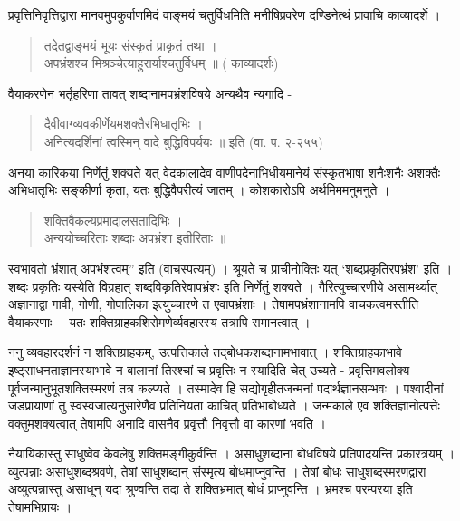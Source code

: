 प्रवृत्तिनिवृत्तिद्वारा मानवमुपकुर्वाणमिदं वाङ्मयं चतुर्विधमिति मनीषिप्रवरेण दण्डिनेत्थं प्रावाचि काव्यादर्शे ।
\begin{verse}
तदेतद्वाङ्मयं भूयः संस्कृतं प्राकृतं तथा ।\\
अपभ्रंशश्च मिश्रञ्चेत्याहुरार्याश्चतुर्विधम् ॥ ( काव्यादर्शः)
\end{verse}
वैयाकरणेन भर्तृहरिणा तावत् शब्दानामपभ्रंशविषये अन्यथैव न्यगादि -
\begin{verse}
दैवीवाग्व्यवकीर्णेयमशक्तैरभिधातृभिः ।\\
अनित्यदर्शिनां त्वस्मिन् वादे बुद्धिविपर्ययः ॥ इति (वा. प. २-२५५)
\end{verse}
अनया कारिकया निर्णेतुं शक्यते यत् वेदकालादेव वाणीपदेनाभिधीयमानेयं संस्कृतभाषा शनैःशनैः अशक्तैः अभिधातृभिः सङ्कीर्णा कृता, यतः बुद्धिवैपरीत्यं जातम् । कोशकारोऽपि अर्थमिममनुमनुते ।
\begin{verse}
शक्तिवैकल्यप्रमादालसतादिभिः ।\\
अन्ययोच्चरिताः शब्दाः अपभ्रंशा इतीरिताः ॥ 
\end{verse}
स्वभावतो भ्रंशात् अपभंशत्वम्” इति (वाचस्पत्यम्) । श्रूयते च प्राचीनोक्तिः यत् ‘शब्दप्रकृतिरपभ्रंश’ इति । शब्दः प्रकृतिः यस्येति विग्रहात् शब्दविकृतिरेवापभ्रंशः इति निर्णेतुं शक्यते । गैरित्युच्चारणीये असामर्थ्यात् अज्ञानाद्वा गावी, गोणी, गोपालिका इत्युच्चारणे त एवापभ्रंशाः । तेषामपभ्रंशानामपि वाचकत्वमस्तीति वैयाकरणाः । यतः शक्तिग्राहकशिरोमणेर्व्यवहारस्य तत्रापि समानत्वात् ।

ननु व्यवहारदर्शनं न शक्तिग्राहकम्, उत्पत्तिकाले तद्बोधकशब्दानामभावात् । शक्तिग्राहकाभावे इष्ट्साधनताज्ञानस्याभावे न बालानां तिरश्चां च प्रवृत्तिः न स्यादिति चेत् उच्यते - प्रवृत्तिमवलोक्य पूर्वजन्मानुभूतशक्तिस्मरणं तत्र कल्प्यते । तस्मादेव हि सद्योगृहीतजन्मनां पदार्थज्ञानसम्भवः । पश्वादीनां जडप्रायाणां तु स्वस्वजात्यनुसारेणैव प्रतिनियता काचित् प्रतिभाबोध्यते । जन्मकाले एव शक्तिज्ञानोत्पत्तेः वक्तुमशक्यत्वात् तेषामपि अनादि वासनैव प्रवृत्तौ निवृत्तौ वा कारणां भवति । 

नैयायिकास्तु साधुष्वेव केवलेषु शक्तिमङ्गीकुर्वन्ति । असाधुशब्दानां बोधविषये प्रतिपादयन्ति प्रकारत्रयम् । व्युत्पन्नाः असाधुशब्दश्रवणे, तेषां साधुशब्दान् संस्मृत्य बोधमाप्नुवन्ति । तेषां बोधः साधुशब्दस्मरणद्वारा । अव्युत्पन्नास्तु असाधून् यदा श्रुण्वन्ति तदा ते शक्तिभ्रमात् बोधं प्राप्नुवन्ति । भ्रमश्च परम्परया इति तेषामभिप्रायः ।

